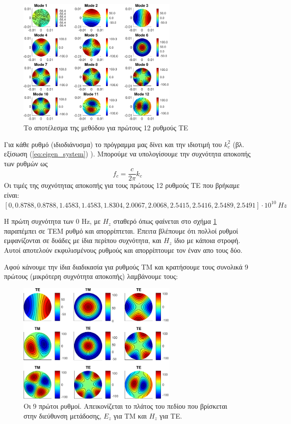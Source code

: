 \documentclass[10pt, letterpaper]{article}
\begin{document}
\begin{figure}[h]
  \centering
  \includegraphics[width=0.7\textwidth]{TE_first_12_modes.pdf}
  \caption{Το αποτέλεσμα της μεθόδου για πρώτους 12 ρυθμούς ΤΕ}
  \label{fig:TE_12_first}
\end{figure}


Για κάθε ρυθμό (ιδιοδιάνυσμα) το πρόγραμμα μας δίνει και την ιδιοτιμή του 
$k_c^2$ (βλ. εξίσωση (\ref{eq:eigen_system}) ).
Μπορούμε να υπολογίσουμε την συχνότητα αποκοπής των ρυθμών ως
\[f_c = \frac{c}{2 \pi}k_c\]
Οι τιμές της συχνότητας αποκοπής για τους πρώτους 12 ρυθμούς ΤΕ που βρήκαμε είναι: \\
$[0, 0.8788, 0.8788, 1.4583,1.4583, 1.8304, 2.0067,2.0068,2.5415, 2.5416,2.5489,2.5491
] \cdot 10^{10} \ Hz$

Η πρώτη συχνότητα των 0 \textlatin{Hz}, με $H_z$ σταθερό όπως φαίνεται στο σχήμα \ref{fig:TE_12_first}
παραπέμπει σε ΤΕΜ ρυθμό και απορρίπτεται. Έπειτα βλέπουμε ότι πολλοί ρυθμοί εμφανίζονται 
σε δυάδες με ίδια περίπου συχνότητα, και $H_z$ ίδιο με κάποια στροφή. 
Αυτοί αποτελούν εκφυλισμένους ρυθμούς και απορρίπτουμε τον έναν απο τους δύο.

Αφού κάνουμε την ίδια διαδικασία για ρυθμούς ΤΜ και κρατήσουμε τους συνολικά 
9 πρώτους (μικρότερη συχνότητα αποκοπής) λαμβάνουμε τους:

\begin{figure}[h]
  \centering
  \includegraphics[width=0.7\textwidth]{Waveguide_first_nine_modes.pdf}
  \caption{Οι 9 πρώτοι ρυθμοί. Απεικονίζεται το πλάτος του πεδίου που βρίσκεται στην 
  διεύθυνση μετάδοσης, $E_z$ για ΤΜ και $H_z$ για ΤΕ.}
  \label{fig:9modes}
\end{figure}
\end{document}
